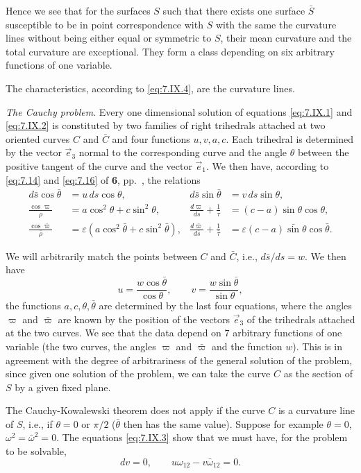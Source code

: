 \documentclass[leqno,11pt]{book}
\numberwithin{equation}{chapter}
\theoremstyle{shape1}
\theoremstyle{shape0}
\theoremstyle{shape2}
\theoremstyle{definition}
\begin{document}
Hence we see that for the surfaces $S$ such that there exists one surface $\bar S$ susceptible to be in point correspondence with $S$ with the same the curvature lines without being either equal or symmetric to $S$, their mean curvature and the total curvature are exceptional. They form a class depending on six arbitrary functions of one variable.

The characteristics, according to \eqref{eq:7.IX.4}, are the curvature lines.

\vspace{12pt}\fsec \emph{The Cauchy problem}. Every one dimensional solution of equations \eqref{eq:7.IX.1} and \eqref{eq:7.IX.2} is constituted by two families of right trihedrals attached at two oriented curves $C$ and $\bar C$ and four functions $u,v,a,c$. Each trihedral is determined by the vector $\vec e_{3}$ normal to the corresponding curve and the angle $\theta$ between the positive tangent of the curve and the vector $\vec e_{1}$. We then have, according to \eqref{eq:7.14} and \eqref{eq:7.16} of \textsection\textbf{6}, pp.~\pageref{eq:7.14}, the relations
\begin{align*}
  d\bar s\cos\bar\theta&=u\,ds\cos\theta,&d\bar s\sin\bar\theta&=v\,ds\sin\theta,\\
  \frac{\cos\varpi}{\rho}&=a\cos^{2}\theta+c\sin^{2}\theta,&\frac{d\varpi}{ds}+\frac{1}{\tau}&=(c-a)\sin\theta\cos\theta,\\
  \frac{\cos\bar\varpi}{\bar\rho}&=\varepsilon(a\cos^{2}\bar\theta+c\sin^{2}\bar\theta),&\frac{d\bar\varpi}{d\bar s}+\frac{1}{\bar\tau}&=\varepsilon(c-a)\bar\sin\theta\cos\bar\theta.
\end{align*}

We will arbitrarily match the points between $C$ and $\bar C$, i.e., $d\bar s/ds=w$. We then have
\[
u=\frac{w\cos\bar\theta}{\cos\theta},\qquad v=\frac{w\sin\bar\theta}{\sin\theta},
\]
the functions $a,c,\theta,\bar\theta$ are determined by the last four equations, where the angles $\varpi$ and $\bar\varpi$ are known by the position of the vectors $\vec e_{3}$ of the trihedrals attached at the two curves. We see that the data depend on $7$ arbitrary functions of one variable (the two curves, the angles $\varpi$ and $\bar\varpi$ and the function $w$). This is in agreement with the degree of arbitrariness of the general solution of the problem, since given one solution of the problem, we can take the curve $C$ as the section of $S$ by a given fixed plane.

The Cauchy-Kowalewski theorem does not apply if the curve $C$ is a curvature line of $S$, i.e., if $\theta=0$ or $\pi/2$ ($\bar\theta$ then has the same value). Suppose for example $\theta=0$, $\omega^{2}=\bar\omega^{2}=0$. The equations \eqref{eq:7.IX.3} show that we must have, for the problem to be solvable, 
\[
dv=0,\qquad u\omega_{12}-v\bar\omega_{12}=0.
\]
\end{document}
